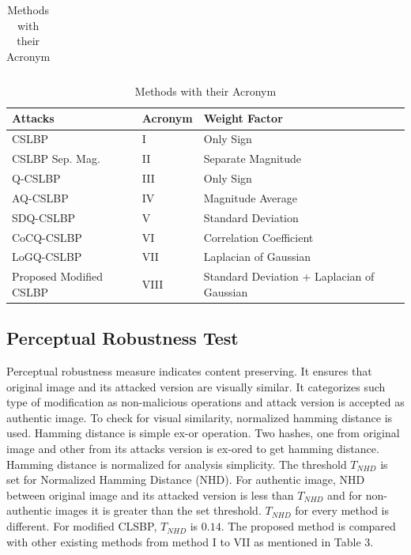 \documentclass[12pt,a4paper]{jihmsp}
\begin{document}
{{\begin{table} [h]
\begin{tabular}{|p{2.9cm}|p{1.4cm}|p{2.9cm}|p{1.4cm}|}
		\hline 
	\end{tabular} 
	\vspace{5mm}
	\captionsetup[table]{justification=centering}
	\centering
	\caption{Methods with their Acronym}
	\begin{tabular}{|p{3.9cm}|p{1.2cm}|p{6.3cm}|}
		\hline   \textbf{Attacks} &     \textbf{Acronym} &     \textbf{Weight Factor}  \\ 
		\hline  CSLBP                &  I    &    Only Sign \\ 
		\hline  CSLBP Sep. Mag. &  II   &    Separate Magnitude \\
		\hline  Q-CSLBP               &  III  &   Only Sign \\
		\hline  AQ-CSLBP              &  IV   &   \small Magnitude Average \\
		\hline  SDQ-CSLBP             &  V    &   \small Standard Deviation \\
		\hline  CoCQ-CSLBP            &  VI   &   \small Correlation Coefficient \\
		\hline LoGQ-CSLBP             &  VII  &   \small Laplacian of Gaussian \\
		\hline  Proposed Modified CSLBP      &  VIII &   \small Standard Deviation + Laplacian of Gaussian \\
		\hline 
	\end{tabular} 	
\end{table}


\subsection{Perceptual Robustness Test}
Perceptual robustness measure indicates content preserving. It ensures that original image and its attacked version are visually similar. It categorizes such type of modification as non-malicious operations and attack version is accepted as authentic image. To check for visual similarity, normalized hamming distance is used. Hamming distance is simple ex-or operation. Two hashes, one from original image and other from its attacks version is ex-ored to get hamming distance. Hamming distance is normalized for analysis simplicity. The threshold $T_{NHD}$ is set for Normalized Hamming Distance (NHD). For authentic image, NHD between original image and its attacked version is less than $T_{NHD}$ and for non-authentic images it is greater than the set threshold. $T_{NHD}$ for every method is different. For modified CLSBP, $T_{NHD}$ is $0.14$. The proposed method is compared with other existing methods from method I to VII as mentioned in Table 3. 

}}
\end{document}
